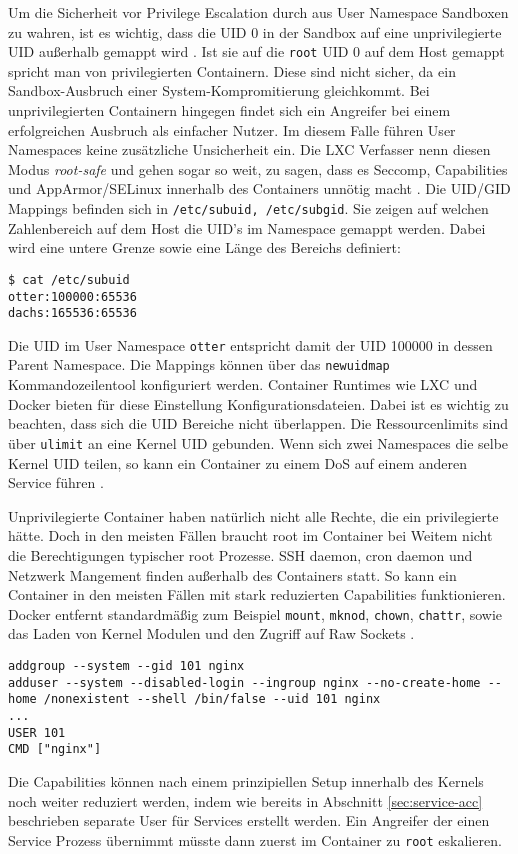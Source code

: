 Um die Sicherheit vor Privilege Escalation durch aus User Namespace Sandboxen zu wahren, ist es wichtig, dass die UID 0 in der Sandbox auf eine unprivilegierte UID außerhalb gemappt wird \cite{lxc-sec, stgraber-unpriv}. Ist sie auf die \texttt{root} UID 0 auf dem Host gemappt spricht man von privilegierten Containern. Diese sind nicht sicher, da ein Sandbox-Ausbruch einer System-Kompromitierung gleichkommt.
Bei unprivilegierten Containern hingegen findet sich ein Angreifer bei einem erfolgreichen Ausbruch als einfacher Nutzer. Im diesem Falle führen User Namespaces keine zusätzliche Unsicherheit ein. Die LXC Verfasser nenn diesen Modus \textit{root-safe} und gehen sogar so weit, zu sagen, dass es Seccomp, Capabilities und AppArmor/SELinux innerhalb des Containers unnötig macht \cite{lxc-sec}. Die UID/GID Mappings befinden sich in \texttt{/etc/subuid, /etc/subgid}. Sie zeigen auf welchen
Zahlenbereich auf dem Host die UID's im Namespace gemappt werden. Dabei wird eine untere Grenze sowie eine Länge des Bereichs definiert:

\begin{lstlisting}
$ cat /etc/subuid
otter:100000:65536
dachs:165536:65536
\end{lstlisting}

Die UID im User Namespace \texttt{otter} entspricht damit der UID 100000 in dessen Parent Namespace. Die Mappings können über das \texttt{newuidmap} Kommandozeilentool konfiguriert werden. Container Runtimes wie LXC und Docker bieten für diese Einstellung Konfigurationsdateien. Dabei ist es wichtig zu beachten, dass sich die UID Bereiche nicht überlappen. Die Ressourcenlimits sind über \texttt{ulimit} an eine Kernel UID gebunden. Wenn sich zwei Namespaces die selbe Kernel UID teilen,
so kann ein Container zu einem DoS auf einem anderen Service führen \cite{lxc-sec}.

Unprivilegierte Container haben natürlich nicht alle Rechte, die ein privilegierte hätte. Doch in den meisten Fällen braucht root im Container bei Weitem nicht die Berechtigungen typischer root Prozesse. SSH daemon, cron daemon und Netzwerk Mangement finden außerhalb des Containers statt. So kann ein Container in den meisten Fällen mit stark reduzierten Capabilities funktionieren. Docker entfernt standardmäßig zum Beispiel \texttt{mount}, \texttt{mknod}, \texttt{chown},
\texttt{chattr}, sowie das Laden von Kernel Modulen und den Zugriff auf Raw Sockets \cite{docker-sec}.

\begin{lstlisting}[caption={Ein Beispiel Dockerfile für einen NGINX Web Server der nicht als root im Container läuft}]
addgroup --system --gid 101 nginx 
adduser --system --disabled-login --ingroup nginx --no-create-home --home /nonexistent --shell /bin/false --uid 101 nginx
...
USER 101
CMD ["nginx"]
\end{lstlisting}

Die Capabilities können nach einem prinzipiellen Setup innerhalb des Kernels noch weiter reduziert werden, indem wie bereits in Abschnitt \ref{sec:service-acc} beschrieben separate User für Services erstellt werden. Ein Angreifer der einen Service Prozess übernimmt müsste dann zuerst im Container zu \texttt{root} eskalieren.  



